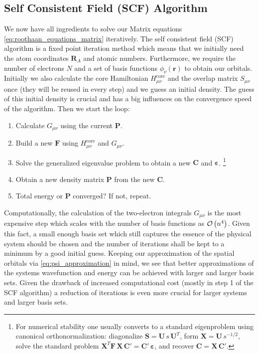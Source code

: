 \subsection{Self Consistent Field (SCF) Algorithm}
\label{subsec:background_hf_scf}
We now have all ingredients to solve our Matrix equations \autoref{eq:roothaan_equations_matrix} iteratively. The self consistent field (SCF) algorithm is a fixed point iteration method which means that we initially need the atom coordinates $\mathbf{R}_A$ and atomic numbers. Furthermore, we require the number of electrons $N$ and a set of basis functions $\phi_\nu(\mathbf{r})$ to obtain our orbitals.\\
Initially we also calculate the core Hamiltonian $H_{\mu\nu}^\text{core}$ and the overlap matrix $S_{\mu\nu}$ once (they will be reused in every step) and we guess an initial density. The guess of this initial density is crucial and has a big influences on the convergence speed of the algorithm. Then we start the loop: 
\begin{enumerate}[itemsep=0.1em]
    \item Calculate $G_{\mu\nu}$ using the current $\mathbf{P}$.
    \item Build a new $\mathbf{F}$ using $H_{\mu\nu}^\text{core}$ and $G_{\mu\nu}$.
    \item Solve the generalized eigenvalue problem to obtain a new $\mathbf{C}$ and $\boldsymbol{\varepsilon}$. \footnote{For numerical stability one usually converts to a standard eigenproblem using canonical orthonormalization: diagonalize $\mathbf{S}=\mathbf{U}\,s\,\mathbf{U}^T$, form $\mathbf{X}=\mathbf{U}\,s^{-1/2}$, solve the standard problem $\mathbf{X}^T\mathbf{F}\,\mathbf{X}\,\mathbf{C}'=\mathbf{C}'\,\boldsymbol{\varepsilon}$, and recover $\mathbf{C}=\mathbf{X}\,\mathbf{C}'$.}
    \item Obtain a new density matrix $\mathbf{P}$ from the new $\mathbf{C}$.
    \item Total energy or $\mathbf{P}$ converged? If not, repeat.
\end{enumerate}

Computationally, the calculation of the two-electron integrals $G_{\mu\nu}$ is the most expensive step which scales with the number of basis functions as $\mathcal{O}\left(n^4\right)$. Given this fact, a small enough basis set which still captures the essence of the physical system should be chosen and the number of iterations shall be kept to a minimum by a good initial guess. Keeping our approximation of the spatial orbitals via \autoref{eq:psi_approximation} in mind, we see that better approximations of the systems wavefunction and energy can be achieved with larger and larger basis sets. Given the drawback of increased computational cost (mostly in step 1 of the SCF algorithm) a reduction of iterations is even more crucial for larger systems and larger basis sets.
